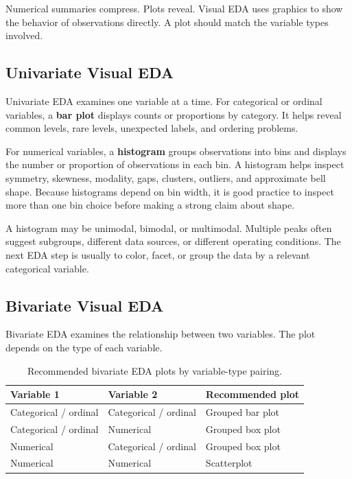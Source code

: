 {Numerical summaries compress.  Plots reveal.  Visual EDA uses graphics to show the behavior of observations directly.  A plot should match the variable types involved.

\subsection{Univariate Visual EDA}

Univariate EDA examines one variable at a time.  For categorical or ordinal variables, a \textbf{bar plot} displays counts or proportions by category.  It helps reveal common levels, rare levels, unexpected labels, and ordering problems.

For numerical variables, a \textbf{histogram} groups observations into bins and displays the number or proportion of observations in each bin.  A histogram helps inspect symmetry, skewness, modality, gaps, clusters, outliers, and approximate bell shape.  Because histograms depend on bin width, it is good practice to inspect more than one bin choice before making a strong claim about shape.

A histogram may be unimodal, bimodal, or multimodal.  Multiple peaks often suggest subgroups, different data sources, or different operating conditions.  The next EDA step is usually to color, facet, or group the data by a relevant categorical variable.

\subsection{Bivariate Visual EDA}

Bivariate EDA examines the relationship between two variables.  The plot depends on the type of each variable.

\begin{table}[h]
\centering
\begin{tabular}{lll}
\hline
Variable 1 & Variable 2 & Recommended plot \\
\hline
Categorical / ordinal & Categorical / ordinal & Grouped bar plot \\
Categorical / ordinal & Numerical & Grouped box plot \\
Numerical & Categorical / ordinal & Grouped box plot \\
Numerical & Numerical & Scatterplot \\
\hline
\end{tabular}
\caption{Recommended bivariate EDA plots by variable-type pairing.}
\label{tab:ch4-bivariate-plot-choice}
\end{table}

}
